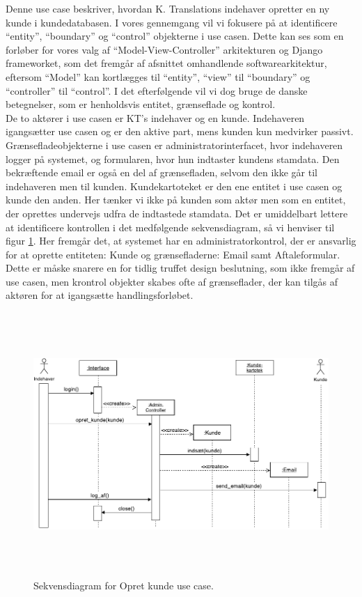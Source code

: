 \documentclass[12pt]{article}   %
\begin{document}
Denne use case beskriver, hvordan K. Translations indehaver opretter en ny
kunde i kundedatabasen. I vores gennemgang vil vi fokusere på at identificere
``entity'', ``boundary'' og ``control'' objekterne i use casen. Dette kan 
ses som en forløber for vores valg af ``Model-View-Controller'' 
arkitekturen og Django frameworket, som det fremgår af afsnittet omhandlende 
softwarearkitektur, eftersom ``Model'' kan kortlægges til ``entity'', ``view''
til ``boundary'' og ``controller'' til ``control''. I det efterfølgende vil vi dog 
bruge de danske betegnelser, som er henholdsvis entitet, grænseflade og kontrol. \\
De to aktører i use casen er KT's indehaver og en kunde. Indehaveren
igangsætter use casen og er den aktive part, mens kunden kun medvirker
passivt. Grænsefladeobjekterne i use casen er administratorinterfacet, hvor indehaveren
logger på systemet, og formularen, hvor hun indtaster kundens stamdata. Den
bekræftende email er også en del af grænsefladen, selvom den ikke går til 
indehaveren men til kunden. Kundekartoteket er den ene entitet i use casen og
kunde den anden. Her tænker vi ikke på kunden som aktør men som en entitet,
der oprettes undervejs udfra de indtastede stamdata. Det er umiddelbart
lettere at identificere kontrollen i det medfølgende sekvensdiagram, så vi
henviser til figur \ref{fig:opret}. Her fremgår det, at systemet har en
administratorkontrol, der er ansvarlig for at oprette entiteten: Kunde og
grænsefladerne: Email samt Aftaleformular. Dette er måske snarere en for tidlig
truffet design beslutning, som ikke fremgår af use casen, men krontrol objekter
skabes ofte af grænseflader, der kan tilgås af aktøren for at igangsætte 
handlingsforløbet.    

\begin{figure}[!ht]
\includegraphics[width=14cm, height=10cm]{seqtwo.pdf}
\caption{Sekvensdiagram for Opret kunde use case.}
\label{fig:opret}
\end{figure}
\end{document}
